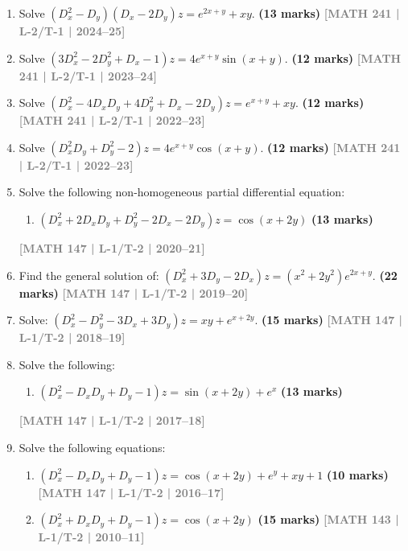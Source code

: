 \documentclass[12pt]{article}
\newcommand{\yr}[1]{\hfill\textcolor{gray}{\small\textbf{[#1]}}}
\newcommand{\mk}[1]{\textcolor{orange!70!black}{\small\textbf{(#1 marks)}}}
\begin{document}
\begin{enumerate}


\item Solve $(D_{x}^{2}-D_{y})(D_{x}-2D_{y})z=e^{2x+y}+xy$.
\mk{13} \yr{MATH 241 | L-2/T-1 | 2024--25}




\item Solve $(3D_{x}^{2}-2D_{y}^{2}+D_{x}-1)z=4e^{x+y}\sin(x+y)$.
\mk{12} \yr{MATH 241 | L-2/T-1 | 2023--24}






\item Solve $(D_{x}^{2}-4D_{x}D_{y}+4D_{y}^{2}+D_{x}-2D_{y})z=e^{x+y}+xy$.
\mk{12} \yr{MATH 241 | L-2/T-1 | 2022--23}



\item Solve $(D_{x}^{2}D_{y}+D_{y}^{2}-2)z=4e^{x+y}\cos(x+y)$.
\mk{12} \yr{MATH 241 | L-2/T-1 | 2022--23}



\item Solve the following non-homogeneous partial differential equation:
\begin{enumerate}
  \item $(D_{x}^{2}+2D_{x}D_{y}+D_{y}^{2}-2D_{x}-2D_{y})z=\cos(x+2y)$ \mk{13}
\end{enumerate}
\yr{MATH 147 | L-1/T-2 | 2020--21}





\item Find the general solution of: $(D_{x}^{2}+3D_{y}-2D_{x})z=(x^{2}+2y^{2})e^{2x+y}$.
\mk{22} \yr{MATH 147 | L-1/T-2 | 2019--20}



\item Solve: $(D_{x}^{2}-D_{y}^{2}-3D_{x}+3D_{y})z=xy+e^{x+2y}$.
\mk{15} \yr{MATH 147 | L-1/T-2 | 2018--19}





\item Solve the following:
\begin{enumerate}
  \item $(D_{x}^{2}-D_{x}D_{y}+D_{y}-1)z=\sin(x+2y)+e^{x}$ \mk{13}
\end{enumerate}
\yr{MATH 147 | L-1/T-2 | 2017--18}



\item Solve the following equations:
\begin{enumerate}
  \item $(D_{x}^{2}-D_{x}D_{y}+D_{y}-1)z=\cos(x+2y)+e^{y}+xy+1$ \mk{10} \yr{MATH 147 | L-1/T-2 | 2016--17}
  \item $(D_{x}^{2}+D_{x}D_{y}+D_{y}-1)z=\cos(x+2y)$ \mk{15} \yr{MATH 143 | L-1/T-2 | 2010--11}
\end{enumerate}






\end{enumerate}
\end{document}
